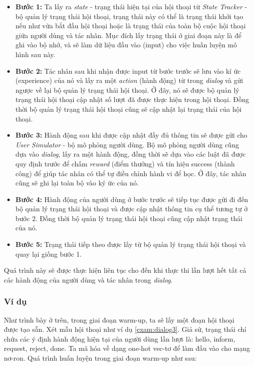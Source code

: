 \begin{itemize}
    \item \textbf{Bước 1:} Ta lấy ra \textit{state} - trạng thái
    hiện tại của hội thoại từ \textit{State Tracker} - bộ quản lý
    trạng thái hội thoại, trạng thái này có thể là trạng thái
    khởi tạo nếu như vừa bắt đầu hội thoại hoặc là trạng thái của
    toàn bộ cuộc hội thoại giữa người dùng và tác nhân. Mục đích lấy
    trạng thái ở giai đoạn này là để ghi vào bộ nhớ, và sẽ làm
    dữ liệu đầu vào (input) cho việc huấn luyện mô hình sau này.
    \item \textbf{Bước 2:} Tác nhân sau khi nhận được input từ
    bước trước sẽ lưu vào kí ức (experience) của nó và lấy ra một
    \textit{action} (hành động) từ trong \textit{dialog} và gửi
    ngược về lại bộ quản lý trạng thái hội thoại. Ở đây, nó sẽ được
    bộ quản lý trạng thái hội thoại cập nhật số lượt đã được
    thực hiện trong hội thoại. Đồng thời bộ quản lý trạng thái
    hội thoại cũng sẽ cập nhật lại trạng thái của hội thoại.
    \item \textbf{Bước 3:} Hành động sau khi được cập nhật đầy đủ
    thông tin sẽ được gửi cho \textit{User Simulator} - bộ
    mô phỏng người dùng. Bộ mô phỏng người dùng cũng dựa vào
    \textit{dialog}, lấy ra một hành động, đồng thời sẽ dựa vào
    các luật đã được quy định trước để chấm \textit{reward}
    (điểm thưởng) và tín hiệu success (thành công) để giúp tác nhân
    có thể tự điều chỉnh hành vi để học. Ở đây, tác nhân cũng sẽ
    ghi lại toàn bộ vào ký ức của nó.
    \item \textbf{Bước 4:} Hành động của người dùng ở bước trước sẽ
    tiếp tục được gửi đi đến bộ quản lý trạng thái hội thoại và
    được cập nhật thông tin cụ thể tương tự ở bước 2. Đồng thời
    bộ quản lý trạng thái hội thoại cũng cập nhật trạng thái của nó.
    \item \textbf{Bước 5:} Trạng thái tiếp theo được lấy từ bộ
    quản lý trạng thái hội thoại và quay lại giống bước 1.
\end{itemize}

Quá trình này sẽ được thực hiện liên tục cho đến khi thực thi
lần lượt hết tất cả các hành động của người dùng và
tác nhân trong \textit{dialog}.

\subsubsection{Ví dụ}
Như trình bày ở trên, trong giai đoạn warm-up, ta sẽ lấy một đoạn
hội thoại được tạo sẵn. Xét mẫu hội thoại như ví dụ
\ref{exam:dialog3}. Giả sử, trạng thái chỉ chứa các ý định hành động
hiện tại của người dùng lần lượt là: hello, inform, request, reject,
done. Ta mã hóa về dạng one-hot vec-tơ để làm đầu vào cho mạng
nơ-ron. Quá trình huấn luyện trong giai đoạn warm-up như sau:

